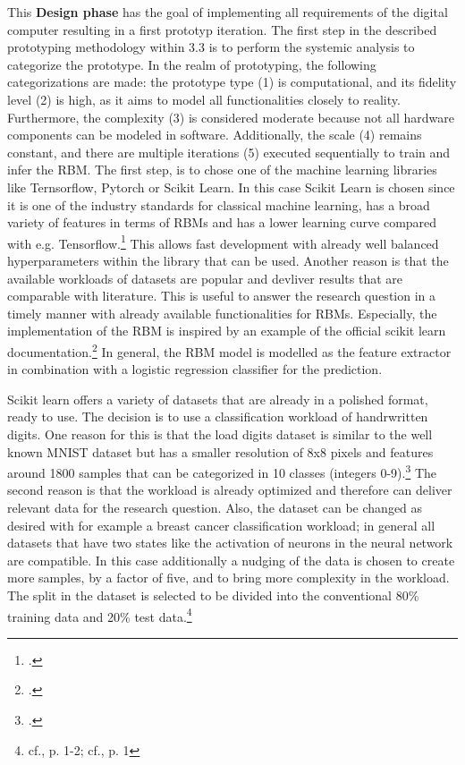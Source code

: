 This \textbf{Design phase} has the goal of implementing all requirements of the digital computer resulting in a first prototyp iteration.
The first step in the described prototyping methodology within 3.3 is to perform the systemic analysis to categorize the prototype.
In the realm of prototyping, the following categorizations are made: the prototype type (1) is computational, and its fidelity level (2) is high, as it aims to model all functionalities closely to reality.
Furthermore, the complexity (3) is considered moderate because not all hardware components can be modeled in software.
Additionally, the scale (4) remains constant, and there are multiple iterations (5) executed sequentially to train and infer the \ac{RBM}.
The first step, is to chose one of the machine learning libraries like Ternsorflow, Pytorch or Scikit Learn. In this case Scikit Learn is chosen since it is one of the industry standards for classical machine learning, has a broad variety of features in terms of \ac{RBM}s
and has a lower learning curve compared with e.g. Tensorflow.\footcite[cf.][5-6]{raschkaMachineLearningPython2020}
This allows fast development with already well balanced hyperparameters within the library that can be used. 
Another reason is that the available workloads of datasets are popular and devliver results that are comparable with literature.
This is useful to answer the research question in a timely manner with already available functionalities for \ac{RBM}s.
Especially, the implementation of the \ac{RBM} is inspired by an example of the official scikit learn documentation.\footcite[cf.][1]{RestrictedBoltzmannMachine}
In general, the RBM model is modelled as the feature extractor in combination with a logistic regression classifier for the prediction.

Scikit learn offers a variety of datasets that are already in a polished format, ready to use. 
The decision is to use a classification workload of handrwritten digits.
One reason for this is that the load digits dataset is similar to the well known MNIST dataset but has a smaller resolution of 8x8 pixels and features around 1800 samples that can be categorized in 10 classes (integers 0-9).\footcite[cf.][1]{SklearnDatasetsLoad_digits}
The second reason is that the workload is already optimized and therefore can deliver relevant data for the research question.
Also, the dataset can be changed as desired with for example a breast cancer classification workload; in general all datasets that have two states like the activation of neurons in the neural network are compatible.
In this case additionally a nudging of the data is chosen to create more samples, by a factor of five, and to bring more complexity in the workload. 
The split in the dataset is selected to be divided into the conventional 80\% training data and 20\% test data.\footnote{cf.\cite{charithaTypeIIDiabetesPrediction2022a}, p. 1-2; cf.\cite{supriAsianStockIndex2023}, p. 1}

